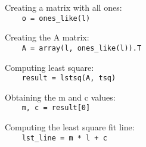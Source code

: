 Creating a matrix with all ones:\\
{\ex \lstinline|    o = ones_like(l)|}

Creating the A matrix:\\
{\ex \lstinline|    A = array(l, ones_like(l)).T|}

Computing least square:\\
{\ex \lstinline|    result = lstsq(A, tsq)|}

Obtaining the m and c values:\\
{\ex \lstinline|    m, c = result[0]|}

Computing the least square fit line:\\
{\ex \lstinline|    lst_line = m * l + c|}


